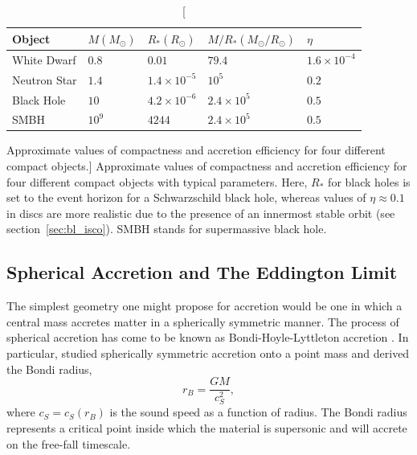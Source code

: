 \begin{table}
\centering
\begin{tabular}{p{4cm}p{2cm}p{2cm}p{3cm}p{2cm}}
\hline 
Object & $M (M_\odot)$ & $R_* (R_\odot)$ & $M/R_* (M_\odot / R_\odot)$ & $\eta$ \\ 
\hline \hline 
White Dwarf & $0.8$ & $0.01$ & $79.4$ & $1.6\times10^{-4}$ \\
Neutron Star & $1.4$ & $1.4\times10^{-5}$ & $10^5$ & $0.2$ \\
Black Hole & $10$ & $4.2\times10^{-6}$ & $2.4\times10^5$ & $0.5$ \\
SMBH & $10^9$ & $4244$ & $2.4\times10^5$ & $0.5$ \\
\hline
\end{tabular}
\centering
\caption
[Approximate values of compactness and accretion efficiency
for four different compact objects.]
{
Approximate values of compactness and accretion efficiency 
for four different compact objects with typical
parameters. Here, $R_*$ for black holes is set to the event horizon
for a Schwarzschild black hole, whereas values of $\eta \approx 0.1$ in discs 
are more realistic due to the presence of an innermost stable 
orbit (see section~\ref{sec:bl_isco}). 
SMBH stands for supermassive black hole.
}
\label{compact}
\end{table}

\subsection{Spherical Accretion and The Eddington Limit}
\label{sec:eddington}

The simplest geometry one might propose for accretion
would be one in which a central mass accretes matter in a spherically
symmetric manner.
The process of spherical accretion has come to be known as 
Bondi-Hoyle-Lyttleton accretion \citep{hoyle1939,bondi1944}.
In particular, \cite{bondi1952} studied spherically symmetric 
accretion onto a point mass and derived the Bondi radius,
\begin{equation}
r_B = \frac{G M}{c_S^2},
\label{eq:bondi}
\end{equation} 
where $c_S = c_S(r_B)$ is the sound speed as a function of radius.
The Bondi radius represents a critical point inside which the material
is supersonic and will accrete on the free-fall timescale.

